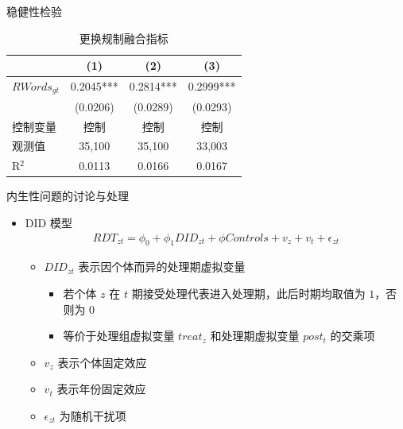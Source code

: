 \documentclass{beamer}
\begin{document}
\begin{frame}{稳健性检验}
    \begin{table}
        \centering
        \caption{更换规制融合指标}
        \label{tab:robustness_check}
        \begin{tabular}{lccc}
            \toprule
            & (1) & (2) & (3) \\
            \midrule
            $RWords_{gt}$ & 0.2045*** & 0.2814*** & 0.2999*** \\
             & (0.0206) & (0.0289) & (0.0293) \\
            控制变量 & 控制 & 控制 & 控制 \\
            观测值 & 35,100 & 35,100 & 33,003 \\
            R$^2$ & 0.0113 & 0.0166 & 0.0167 \\
            \bottomrule
        \end{tabular}
    \end{table}
\end{frame}

\begin{frame}{内生性问题的讨论与处理}
    \begin{itemize}
        \item DID 模型
        \begin{gather*}
            RDT_{zt}=\phi_0+\phi_1 DID_{zt}+\phi Controls+v_z+v_t+\epsilon_{zt} \tag{13}
        \end{gather*}
        \begin{itemize}
            \item $DID_{zt}$ 表示因个体而异的处理期虚拟变量
            \begin{itemize}
                \item 若个体 $z$ 在 $t$ 期接受处理代表进入处理期，此后时期均取值为 $1$，否则为 $0$
                \item 等价于处理组虚拟变量 $treat_z$ 和处理期虚拟变量 $post_t$ 的交乘项
            \end{itemize}
            \item $v_z$ 表示个体固定效应
            \item $v_t$ 表示年份固定效应
            \item $\epsilon_{zt}$ 为随机干扰项
        \end{itemize}
    \end{itemize}    
\end{frame}
\end{document}
